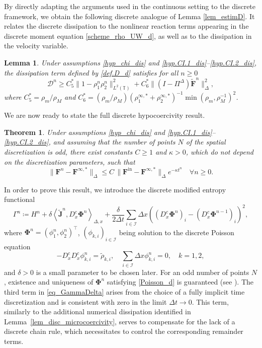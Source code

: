 \documentclass[reqno]{amsart}
\newtheorem{Theorem}{Theorem}
\newtheorem{Lemma}{Lemma}
\newcommand{\Dt}{\Delta t}
\newcommand{\Dx}{\Delta x}
\newcommand{\T}{\mathbb{T}}
\newcommand{\II}{\mathcal{I}}
\newcommand{\Ft}{{\widetilde{F}}}
\newcommand{\rhot}{\widetilde{\rho}}
\newcommand{\Jt}{\widetilde{J}}
\newcommand{\Ftbf}{\mathbf{\Ft}}
\newcommand{\Fbf}{\mathbf{F}}
\newcommand{\Phibf}{\boldsymbol{\Phi}}
\newcommand{\Jtbf}{\mathbf{\Jt}}
\newcommand{\tin}{{\mathrm{in}}}
\newcommand{\lla}{\left\langle}
\newcommand{\rra}{\right\rangle}
\numberwithin{equation}{section}
\begin{document}
By directly adapting the arguments used in the continuous setting to the discrete framework, we obtain the following discrete analogue of Lemma \ref{lem_estimD}. It relates the discrete dissipation to the nonlinear reaction terms appearing in the discrete moment equation \eqref{scheme_rho_UW_d}, as well as to the dissipation in the velocity variable.
\begin{Lemma}\label{lem_estimD_d}
Under assumptions \eqref{hyp_chi_dis} and \eqref{hyp.CI.1_dis}--\eqref{hyp.CI.2_dis}, the dissipation term defined by \eqref{def.D_d} satisfies for all $n\geq 0$
\begin{equation}\label{estim.D_d}
    \mathcal{D}^n\geq C_5^*\|1-\rho_1^n\rho_2^n\|_{L^2(\T)}^2+C_6^*\|(I-\Pi^\Delta)\Ftbf^n\|^2_\Delta,
\end{equation}
where $C_5^*=\rho_m/\rho_M$ and $C_6^*=(\rho_m/\rho_M)(\rho_1^{\infty,*}+\rho_2^{\infty,*})^{-1}\min(\rho_m,\rho_M^{-1})^2$.
\end{Lemma}


We are now ready to state the full discrete hypocoercivity result.

\begin{Theorem}\label{thm.hypoco_d}
    Under assumptions \eqref{hyp_chi_dis} and \eqref{hyp.CI.1_dis}--\eqref{hyp.CI.2_dis}, and assuming that the number of points $N$ of the spatial discretization is odd, there exist constants $C\geq 1$ and $\kappa>0$, which do not depend on the discretization parameters, such that 
    \begin{equation}
    \|\Fbf^n-\Fbf^{\infty,*}\|_\Delta\leq C\,\|\Fbf^\tin-\Fbf^{\infty,*}\|_\Delta e^{-\kappa t^n} \quad \forall n\geq 0.
    \end{equation}
\end{Theorem}

In order to prove this result, we introduce the discrete modified entropy functional
\begin{equation}\label{eq_GammaDelta}
    \Gamma^n\coloneq  H^n+\delta\lla \Jtbf^n,D_x^c\Phibf^n\rra_{\Delta,x}+\frac{\delta}{2\Delta t}\sum_{i\in\II}\Dx \left((D_x^c\Phibf^n)_i-(D_x^c\Phibf^{n-1})_i\right)^2,
\end{equation}
where $\Phibf^n=\left(\phi^n_1, \phi^n_2\right)^\top$, $(\phi_{k,i})_{i\in\II}$ being solution to the discrete Poisson equation
\begin{equation}\label{Poisson_d}
    -D_x^cD_x^c\phi^n_{k,i}=\rhot_{k,i},\quad\sum_{i\in\II}\Dx\phi^n_{k,i}=0, \quad k=1,2,
\end{equation}
and $\delta>0$ is a small parameter to be chosen later. For an odd number of points $N$, existence and uniqueness of $\Phibf^n$ satisfying \eqref{Poisson_d} is guaranteed (see \cite{BessemoulinHerdaRey2020}). The third term in \eqref{eq_GammaDelta} arises from the choice of a fully implicit time discretization and is consistent with zero in the limit $\Dt \to 0$. This term, similarly to the additional numerical dissipation identified in Lemma~\ref{lem_disc_microcoercivity}, serves to compensate for the lack of a discrete chain rule, which necessitates to control the corresponding remainder terms.\\
\end{document}

